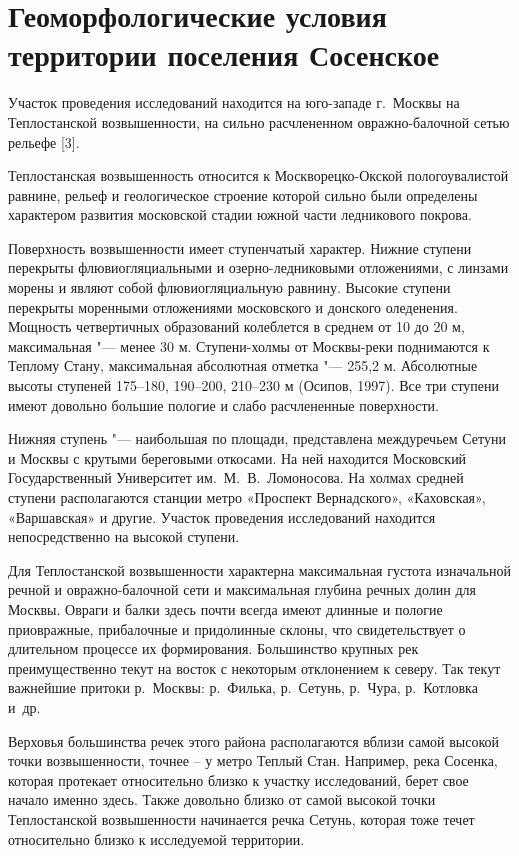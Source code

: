 \chapter{Геоморфологические условия территории поселения Сосенское}\label{ch:ch3}

Участок проведения исследований находится на юго-западе г.~Москвы на Теплостанской возвышенности, на сильно расчлененном овражно-балочной сетью рельефе [3]. 

Теплостанская возвышенность относится к Москворецко-Окской пологоувалистой равнине, рельеф 
и геологическое строение которой сильно были определены характером развития московской 
стадии южной части ледникового покрова. 

Поверхность возвышенности имеет ступенчатый характер. Нижние ступени перекрыты флювиогляциальными 
и озерно-ледниковыми отложениями, с линзами морены и являют собой флювиогляциальную равнину. 
Высокие ступени перекрыты моренными отложениями московского и донского оледенения. 
Мощность четвертичных образований колеблется в среднем от 10 до 20 м, максимальная "--- менее 30 м. 
Ступени-холмы от Москвы-реки поднимаются к Теплому Стану, максимальная абсолютная отметка "--- 255,2 м. 
Абсолютные высоты ступеней 175--180, 190--200, 210--230 м (Осипов, 1997). 
Все три ступени имеют довольно большие пологие 
и слабо расчлененные поверхности. 

Нижняя ступень "--- наибольшая по площади, представлена междуречьем Сетуни 
и Москвы с крутыми береговыми откосами. На ней находится 
Московский Государственный Университет им.~М.~В.~Ломоносова. 
На холмах средней ступени располагаются станции метро «Проспект Вернадского», 
«Каховская», «Варшавская» и другие. 
Участок проведения исследований находится непосредственно на высокой ступени. 

Для Теплостанской возвышенности характерна максимальная густота изначальной речной 
и овражно-балочной сети и максимальная глубина речных долин для Москвы. 
Овраги и балки здесь почти всегда имеют длинные и пологие приовражные, прибалочные и придолинные склоны, 
что свидетельствует о длительном процессе их формирования. Большинство крупных рек преимущественно текут 
на восток с некоторым отклонением к северу. Так текут важнейшие притоки р.~Москвы: 
р.~Филька, р.~Сетунь, р.~Чура, р.~Котловка и~др. 

Верховья большинства речек этого района располагаются вблизи самой высокой точки возвышенности, 
точнее – у метро Теплый Стан. Например, река Сосенка, которая протекает 
относительно близко к участку исследований, 
берет свое начало именно здесь. Также довольно близко от самой высокой точки 
Теплостанской возвышенности начинается речка Сетунь, которая тоже течет 
относительно близко к исследуемой территории.